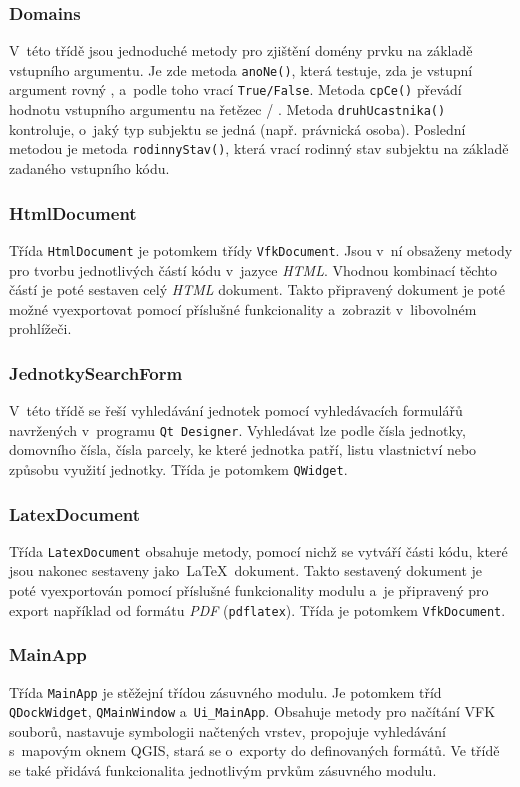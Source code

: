 \documentclass[a4paper,12pt,oneside]{book}
\newcommand{\latex}{\LaTeX}
\begin{document}
\subsubsection{Domains}
V~této třídě jsou jednoduché metody pro zjištění domény prvku na
základě vstupního argumentu. Je zde metoda \texttt{anoNe()}, která
testuje, zda je vstupní argument rovný , a~podle toho vrací
\texttt{True/False}. Metoda \texttt{cpCe()} převádí hodnotu
vstupního argumentu na řetězec  / . Metoda \texttt{druhUcastnika()} kontroluje, o~jaký
typ subjektu se jedná (např. právnická osoba). Poslední metodou je
metoda \texttt{rodinnyStav()}, která vrací rodinný stav subjektu na
základě zadaného vstupního kódu.

\subsubsection{HtmlDocument}

Třída \texttt{HtmlDocument} je potomkem třídy \texttt{VfkDocument}. 
Jsou v~ní obsaženy metody pro tvorbu
jednotlivých částí kódu v~jazyce \textit{HTML}. Vhodnou kombinací
těchto částí je poté sestaven celý \textit{HTML} dokument. Takto
připravený dokument je poté možné vyexportovat pomocí příslušné
funkcionality a~zobrazit v~libovolném prohlížeči.

\subsubsection{JednotkySearchForm}
V~této třídě se řeší vyhledávání jednotek pomocí vyhledávacích
formulářů navržených v~programu \texttt{Qt Designer}. Vyhledávat lze
podle čísla jednotky, domovního čísla, čísla parcely, ke které
jednotka patří, listu vlastnictví nebo způsobu využití jednotky. Třída
je potomkem \texttt{QWidget}.

\subsubsection{LatexDocument}
Třída \texttt{LatexDocument} obsahuje metody, pomocí nichž se vytváří
části kódu, které jsou nakonec sestaveny jako~\latex~dokument. Takto
sestavený dokument je poté vyexportován pomocí příslušné funkcionality
modulu a~je připravený pro export například od formátu \textit{PDF}
(\texttt{pdflatex}). Třída je potomkem \texttt{VfkDocument}.

\subsubsection{MainApp}
Třída \texttt{MainApp} je stěžejní třídou zásuvného modulu. Je
potomkem tříd \texttt{QDockWidget}, \texttt{QMainWindow}
a~\texttt{Ui\_MainApp}. Obsahuje metody pro načítání VFK souborů,
nastavuje symbologii načtených vrstev, propojuje vyhledávání s~mapovým
oknem QGIS, stará se o~exporty do definovaných formátů. Ve třídě se
také přidává funkcionalita jednotlivým prvkům zásuvného modulu.
\end{document}
